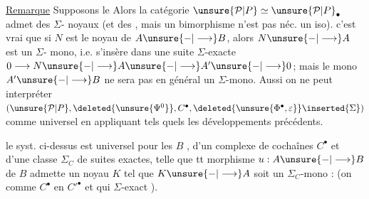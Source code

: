 \uline{Remarque} Supposons le  Alors
la catégorie $\unsure{\mathcal P|P}\simeq\unsure{\mathcal P|P}_\bullet$  admet des $\Sigma$-
noyaux (et des , mais un
bimorphisme n'est pas néc. un iso). 
c'est  vrai que si $N$ est le noyau
de $A\unsure{-|\longrightarrow}B$, alors $N\unsure{-|\longrightarrow}A$ est un $\Sigma$-
mono, i.e. s'insère dans une suite $\Sigma$-exacte
$0\longrightarrow N\unsure{-|\longrightarrow}A\unsure{-|\longrightarrow}A'\unsure{-|\longrightarrow}0$; mais le mono
$A'\unsure{-|\longrightarrow}B$ ne sera pas en général un
$\Sigma$-mono. Aussi on ne peut interpréter
$(\unsure{\mathcal P|P},\deleted{\unsure{\Psi^0}},C^\bullet,\deleted{\unsure{\Phi^\bullet,\varepsilon}}\inserted{\Sigma})$
comme   universel en appliquant tels quels les
développements précédents.

 le syst. ci-dessus est universel
pour les $B$ ,  d'un complexe
de cochaînes 
$C^\bullet$ et d'une classe
$\Sigma_C$ de suites exactes, telle que tt
morphisme $u:A\unsure{-|\longrightarrow}B$ de $B$ admette
un noyau $K$ tel que $K\unsure{-|\longrightarrow}A$ soit un
$\Sigma_C$-mono : (on  comme
 $C^\bullet$ en $C'^\bullet$ et qui
 $\Sigma$-exact ).

